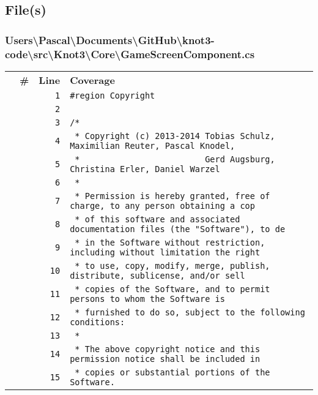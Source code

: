\documentclass[a4paper,10pt]{article}
\begin{document}
\subsection{File(s)}
\subsubsection{Users\textbackslash Pascal\textbackslash Documents\textbackslash GitHub\textbackslash knot3-code\textbackslash src\textbackslash Knot3\textbackslash Core\textbackslash GameScreenComponent.cs}
\begin{longtable}[l]{lrrl}
\textbf{} & \textbf{\#} & \textbf{Line} & \textbf{Coverage}\\
\cellcolor{gray} &  & \verb~1~ & \verb~#region Copyright~\\
\cellcolor{gray} &  & \verb~2~ & \verb~~\\
\cellcolor{gray} &  & \verb~3~ & \verb~/*~\\
\cellcolor{gray} &  & \verb~4~ & \verb~ * Copyright (c) 2013-2014 Tobias Schulz, Maximilian Reuter, Pascal Knodel,~\\
\cellcolor{gray} &  & \verb~5~ & \verb~ *                         Gerd Augsburg, Christina Erler, Daniel Warzel~\\
\cellcolor{gray} &  & \verb~6~ & \verb~ *~\\
\cellcolor{gray} &  & \verb~7~ & \verb~ * Permission is hereby granted, free of charge, to any person obtaining a cop~\\
\cellcolor{gray} &  & \verb~8~ & \verb~ * of this software and associated documentation files (the "Software"), to de~\\
\cellcolor{gray} &  & \verb~9~ & \verb~ * in the Software without restriction, including without limitation the right~\\
\cellcolor{gray} &  & \verb~10~ & \verb~ * to use, copy, modify, merge, publish, distribute, sublicense, and/or sell~\\
\cellcolor{gray} &  & \verb~11~ & \verb~ * copies of the Software, and to permit persons to whom the Software is~\\
\cellcolor{gray} &  & \verb~12~ & \verb~ * furnished to do so, subject to the following conditions:~\\
\cellcolor{gray} &  & \verb~13~ & \verb~ *~\\
\cellcolor{gray} &  & \verb~14~ & \verb~ * The above copyright notice and this permission notice shall be included in ~\\
\cellcolor{gray} &  & \verb~15~ & \verb~ * copies or substantial portions of the Software.~\\

\end{longtable}
\end{document}
